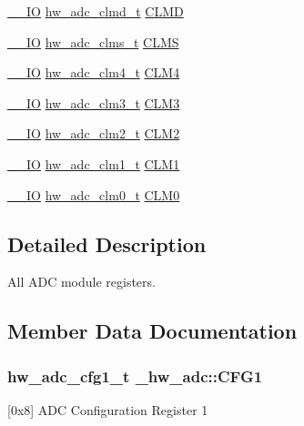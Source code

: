 \begin{DoxyCompactItemize}
\item 
\hyperlink{core__sc300_8h_aec43007d9998a0a0e01faede4133d6be}{\+\_\+\+\_\+\+IO} \hyperlink{union__hw__adc__clmd}{hw\+\_\+adc\+\_\+clmd\+\_\+t} \hyperlink{struct__hw__adc_a29eae2b2e05ea54c1a231548ecbcbcb4}{C\+L\+MD}
\item 
\hyperlink{core__sc300_8h_aec43007d9998a0a0e01faede4133d6be}{\+\_\+\+\_\+\+IO} \hyperlink{union__hw__adc__clms}{hw\+\_\+adc\+\_\+clms\+\_\+t} \hyperlink{struct__hw__adc_ac9196e46d2b22fd8fa82c93406aaaf71}{C\+L\+MS}
\item 
\hyperlink{core__sc300_8h_aec43007d9998a0a0e01faede4133d6be}{\+\_\+\+\_\+\+IO} \hyperlink{union__hw__adc__clm4}{hw\+\_\+adc\+\_\+clm4\+\_\+t} \hyperlink{struct__hw__adc_a19a939ee1f1317b94a5d8fcda77c336f}{C\+L\+M4}
\item 
\hyperlink{core__sc300_8h_aec43007d9998a0a0e01faede4133d6be}{\+\_\+\+\_\+\+IO} \hyperlink{union__hw__adc__clm3}{hw\+\_\+adc\+\_\+clm3\+\_\+t} \hyperlink{struct__hw__adc_a57e632a8e8752ae4f1ecb894a91dd36e}{C\+L\+M3}
\item 
\hyperlink{core__sc300_8h_aec43007d9998a0a0e01faede4133d6be}{\+\_\+\+\_\+\+IO} \hyperlink{union__hw__adc__clm2}{hw\+\_\+adc\+\_\+clm2\+\_\+t} \hyperlink{struct__hw__adc_abb34fd6c80ea526543d3f84fe9836e0d}{C\+L\+M2}
\item 
\hyperlink{core__sc300_8h_aec43007d9998a0a0e01faede4133d6be}{\+\_\+\+\_\+\+IO} \hyperlink{union__hw__adc__clm1}{hw\+\_\+adc\+\_\+clm1\+\_\+t} \hyperlink{struct__hw__adc_a896fd830a70731d0a8db21d7f65c3cbb}{C\+L\+M1}
\item 
\hyperlink{core__sc300_8h_aec43007d9998a0a0e01faede4133d6be}{\+\_\+\+\_\+\+IO} \hyperlink{union__hw__adc__clm0}{hw\+\_\+adc\+\_\+clm0\+\_\+t} \hyperlink{struct__hw__adc_af5fa35e4bd18dc84579ab900ea0e8dcb}{C\+L\+M0}
\end{DoxyCompactItemize}


\subsection{Detailed Description}
All A\+DC module registers. 

\subsection{Member Data Documentation}
\subsubsection[{\texorpdfstring{C\+F\+G1}{CFG1}}]{ {\bf hw\+\_\+adc\+\_\+cfg1\+\_\+t} \+\_\+hw\+\_\+adc\+::\+C\+F\+G1}\hypertarget{struct__hw__adc_a3c23c49ae8be95469b9e12844efa3942}{}\label{struct__hw__adc_a3c23c49ae8be95469b9e12844efa3942}
\mbox{[}0x8\mbox{]} A\+DC Configuration Register 1 
